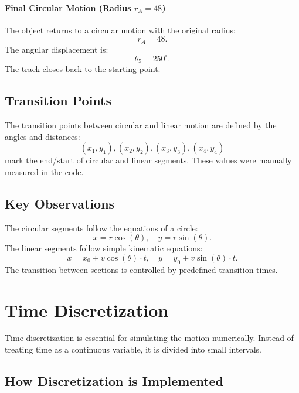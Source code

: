 \documentclass[a4paper,11pt]{article}
\begin{document}
\paragraph{Final Circular Motion (Radius $r_A = 48$)}
The object returns to a circular motion with the original radius:
\begin{equation}
r_A = 48.
\end{equation}
The angular displacement is:
\begin{equation}
\theta_5 = 250^\circ.
\end{equation}
The track closes back to the starting point.

\subsection*{Transition Points}
The transition points between circular and linear motion are defined by the angles and distances:
\begin{equation}
(x_1, y_1), (x_2, y_2), (x_3, y_3), (x_4, y_4)
\end{equation}
mark the end/start of circular and linear segments. These values were manually measured in the code.

\subsection*{Key Observations}
The circular segments follow the equations of a circle:
\begin{equation}
    x = r \cos(\theta), \quad y = r \sin(\theta).
\end{equation}
The linear segments follow simple kinematic equations:
\begin{equation}
    x = x_0 + v \cos(\theta) \cdot t, \quad y = y_0 + v \sin(\theta) \cdot t.
\end{equation}
The transition between sections is controlled by predefined transition times.

\section*{Time Discretization}
Time discretization is essential for simulating the motion numerically. Instead of treating time as a continuous variable, it is divided into small intervals.

\subsection*{How Discretization is Implemented}
\end{document}

